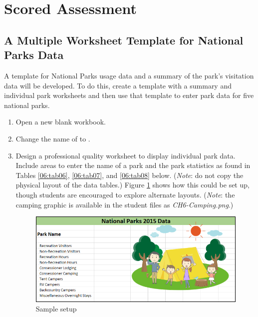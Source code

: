 \section{Scored Assessment}

\subsection{A Multiple Worksheet Template for National Parks Data}

A template for National Parks usage data and a summary of the park's visitation data will be developed. To do this, create a template with a  summary and individual park worksheets and then use that template to enter park data for five national parks.

\begin{enumbox}
	\begin{enumerate}
		\item Open a new blank workbook.
		\item Change the name of  to . 
		\item Design a professional quality worksheet to display individual park data. Include areas to enter the name of a park and the park statistics as found in Tables \ref{06:tab06}, \ref{06:tab07}, and \ref{06:tab08} below. (\textit{Note}: do not copy the physical layout of the data tables.) Figure \ref{06:fig17} shows how this could be set up, though students are encouraged to explore alternate layouts. (\textit{Note}: the camping graphic is available in the student files as \textit{CH6-Camping.png}.)

		\begin{figure}[H]
			\centering
			\includegraphics[width=\maxwidth{.95\linewidth}]{gfx/ch06_fig17}
			\caption{Sample setup}
			\label{06:fig17}
		\end{figure}


\end{enumerate}
\end{enumbox}
